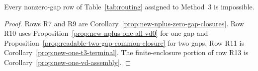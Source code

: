 \begin{proposition}
\label{prop:finite-enclosure-nonzero-gap-branches}
Every nonzero-gap row of Table~\ref{tab:routing} assigned to Method~3 is
impossible.
\end{proposition}

\begin{proof}
Rows R7 and R9 are Corollary~\ref{prop:new-nplus-zero-gap-closures}.  Row R10
uses Proposition~\ref{prop:new-nplus-one-all-vd0} for one gap and
Proposition~\ref{prop:readable-two-gap-common-closure} for two gaps.  Row R11
is Corollary~\ref{prop:new-one-t3-terminal}.  The finite-enclosure portion of
row R13 is Corollary~\ref{prop:new-one-vd-assembly}.
\end{proof}
